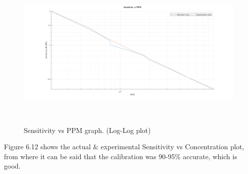 \begin{figure}[H]
	\begin{Center}
		\includegraphics[width=6.5in,height=3in]{26}
		\caption{Sensitivity vs PPM graph. (Log-Log plot)}
		\label{fig:_12_Sensitivity_vs_PPM_graph_LogLog_plot}
	\end{Center}
\end{figure}
Figure 6.12 shows the actual $\&$  experimental Sensitivity vs Concentration plot, from where it can be said that the calibration was 90-95$\%$  accurate, which is good.

